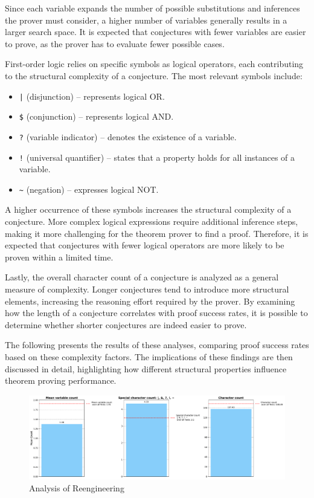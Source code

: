 \documentclass[english,version-2020-11]{uzl-thesis}
\begin{document}
Since each variable expands the number of possible substitutions and inferences the prover must consider, a higher number of variables generally results in a larger search space. It is expected that conjectures with fewer variables are easier to prove, as the prover has to evaluate fewer possible cases.

First-order logic relies on specific symbols as logical operators, each contributing to the structural complexity of a conjecture. The most relevant symbols include:
\begin{itemize}
    \item \texttt{|} (disjunction) – represents logical OR.
    \item \texttt{\$} (conjunction) – represents logical AND.
    \item \texttt{?} (variable indicator) – denotes the existence of a variable.
    \item \texttt{!} (universal quantifier) – states that a property holds for all instances of a variable.
    \item \texttt{\~{}} (negation) – expresses logical NOT.
\end{itemize}
A higher occurrence of these symbols increases the structural complexity of a conjecture. More complex logical expressions require additional inference steps, making it more challenging for the theorem prover to find a proof. Therefore, it is expected that conjectures with fewer logical operators are more likely to be proven within a limited time.

Lastly, the overall character count of a conjecture is analyzed as a general measure of complexity. Longer conjectures tend to introduce more structural elements, increasing the reasoning effort required by the prover. By examining how the length of a conjecture correlates with proof success rates, it is possible to determine whether shorter conjectures are indeed easier to prove.

The following presents the results of these analyses, comparing proof success rates based on these complexity factors. The implications of these findings are then discussed in detail, highlighting how different structural properties influence theorem proving performance.


\begin{figure}[h!]
    \centering
    \includegraphics[width=\textwidth]{combined_graphs.pdf}
    \caption{Analysis of Reengineering}
    \label{fig:analysis_reeingieering}
\end{figure}
\FloatBarrier
\end{document}
